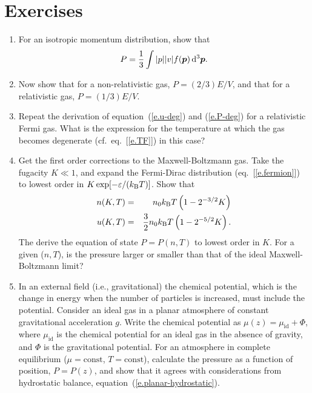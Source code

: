 \section{Exercises}\label{s.EOS-exercises}
\begin{enumerate}
\item For an isotropic momentum distribution, show that 
\[
P = \frac{1}{3}\int |p||v| f(\boldsymbol{p})\,\mathrm{d}^{3}\boldsymbol{p}.
\]
\item Now show that for a non-relativistic gas, $P = (2/3)E/V$, and that for a relativistic gas, $P = (1/3)E/V$.

\item Repeat the derivation of equation~(\ref{e.u-deg}) and (\ref{e.P-deg}) for  a relativistic Fermi gas. What is the expression for the temperature at which the gas becomes degenerate (cf.~eq.~[\ref{e.TF}]) in this case?

\item Get the first order corrections to the Maxwell-Boltzmann gas. Take the fugacity $K \ll 1$, and expand the Fermi-Dirac distribution  (eq.~[\ref{e.fermion}]) to lowest order in $K\exp[-\varepsilon/(k_\mathrm{B} T)]$. Show that 
\begin{eqnarray*}
 n(K,T) &=& n_{0}k_\mathrm{B} T\left(1 - 2^{-3/2}K\right) \\
 u(K,T) &=& \frac{3}{2}n_{0}k_\mathrm{B} T \left(1-2^{-5/2}K\right).
\end{eqnarray*}
The derive the equation of state $P = P(n,T)$ to lowest order in $K$. For a given ($n, T$), is the pressure larger or smaller than that of the ideal Maxwell-Boltzmann limit?

\item In an external field (i.e., gravitational) the chemical potential, which is the change in energy when the number of particles is increased, must include the potential.  Consider an ideal gas in a planar atmosphere of  constant gravitational acceleration $g$.  Write the chemical potential as $\mu(z)  = \mu_{\mathrm{id}} + \Phi$, where $\mu_{\mathrm{id}}$ is the chemical potential for an ideal gas in the absence of gravity, and $\Phi$ is the gravitational potential.  For an atmosphere in complete equilibrium ($\mu = \mathrm{const}$, $T = \mathrm{const}$), calculate the pressure as a function of position, $P = P(z)$, and show that it agrees with considerations from hydrostatic balance, equation~(\ref{e.planar-hydrostatic}).

\end{enumerate}
